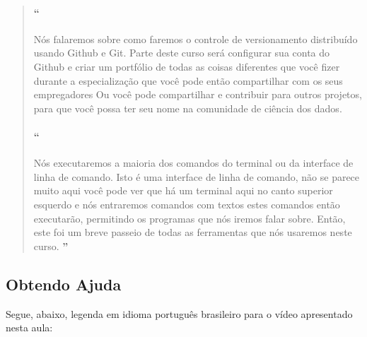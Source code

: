 \begin{quotation}
\begin{small}
\paragraph{``}
Nós falaremos sobre como faremos o controle de versionamento distribuído usando Github e Git. Parte deste curso será configurar sua conta do Github e criar um portfólio de todas as coisas diferentes que você fizer durante a especialização que você pode então compartilhar com os seus empregadores Ou você pode compartilhar e contribuir para outros projetos, para que você possa ter seu nome na comunidade de ciência dos dados.

\paragraph{``}
Nós executaremos a maioria dos comandos do terminal ou da interface de linha de comando. Isto é uma interface de linha de comando, não se parece muito aqui você pode ver que há um terminal aqui no canto superior esquerdo e nós entraremos comandos com textos estes comandos então executarão, permitindo os programas que nós iremos falar sobre. Então, este foi um breve passeio de todas as ferramentas que nós usaremos neste curso.
{\large\textbf{''}}
\end{small}
\end{quotation}


\subsection{Obtendo Ajuda}

Segue, abaixo, legenda em idioma português brasileiro para o vídeo apresentado nesta aula:

